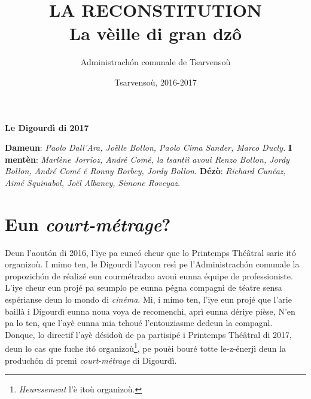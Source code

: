 \title{LA RECONSTITUTION\\ La vèille di gran dz\^{o}}
\author{Administrach\'on comunale de Tsarvensoù}
\date{Tsarvensoù, 2016-2017}

\maketitle

\markboth{\MakeUppercase{\thetitle}}{\MakeUppercase{\thetitle}}

\cleardoublepage 
\vspace*{\fill}
\begin{center}
\textbf{\LARGE Le Digourdì di 2017}
\end{center}

\begin{figure}[h]
\centering
{}
\end{figure}
\noindent
\textbf{Dameun}: \textit{Paolo Dall'Ara, Jo\"{e}lle Bollon, Paolo Cima Sander, Marco Ducly.}
\newline
\newline
\textbf{I mentèn}: \textit{Marlène Jorrioz, André Comé, la tsantiì avouì Renzo Bollon, Jordy Bollon,  André Comé é Ronny Borbey, Jordy Bollon.}
\newline
\newline
\textbf{Dézò}: \textit{Richard Cunéaz, Aimé Squinabol, Jo\"{e}l Albaney, Simone Roveyaz.}


\section*{Eun \textit{court-métrage}?}
Deun l'aout\'on di 2016, l'iye pa eunc\'o cheur que lo Printemps Thé\^atral sarie it\'o organizoù. I mimo ten, le Digourdì l'ayoon resì pe l'Administrach\'on comunale la propozich\'on de réalizé eun courmétradzo avouì eunna équipe de professioniste. L'iye cheur eun projé pa seumplo pe eunna pégna compagnì de téatre sensa espérianse deun lo mondo di \textit{cinéma}. Mi, i mimo ten, l'iye eun projé que l'arie baillà i Digourdì eunna noua voya de recomenchì, aprì eunna dériye pièse, \og N'en pa lo ten\fg, que l'ayè eunna mia tchoué l'entouziasme dedeun la compagnì. 
\\Donque, lo directif l'ayè désidoù de pa partisipé i Printemps Thé\^atral di 2017, deun lo cas que fuche it\'o organizoù\footnote{ \textit{Heuresement} l'è itoù organizoù.}, pe pouèi bouré totte le-z-énerjì deun la produch\'on di premì \textit{court-métrage} di Digourdì.

